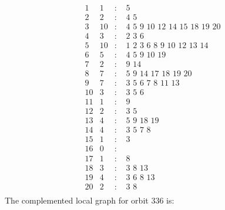 \documentclass[12pt]{article}
\begin{document}
\begin{equation*}
\begin{array}{rrcl}
1&1&:&\,\,5\\
2&2&:&\,\,4\,\,5\\
3&10&:&\,\,4\,\,5\,\,9\,\,10\,\,12\,\,14\,\,15\,\,18\,\,19\,\,20\\
4&3&:&\,\,2\,\,3\,\,6\\
5&10&:&\,\,1\,\,2\,\,3\,\,6\,\,8\,\,9\,\,10\,\,12\,\,13\,\,14\\
6&5&:&\,\,4\,\,5\,\,9\,\,10\,\,19\\
7&2&:&\,\,9\,\,14\\
8&7&:&\,\,5\,\,9\,\,14\,\,17\,\,18\,\,19\,\,20\\
9&7&:&\,\,3\,\,5\,\,6\,\,7\,\,8\,\,11\,\,13\\
10&3&:&\,\,3\,\,5\,\,6\\
11&1&:&\,\,9\\
12&2&:&\,\,3\,\,5\\
13&4&:&\,\,5\,\,9\,\,18\,\,19\\
14&4&:&\,\,3\,\,5\,\,7\,\,8\\
15&1&:&\,\,3\\
16&0&:&\\
17&1&:&\,\,8\\
18&3&:&\,\,3\,\,8\,\,13\\
19&4&:&\,\,3\,\,6\,\,8\,\,13\\
20&2&:&\,\,3\,\,8\\
\end{array}
\end{equation*}
The complemented local graph for orbit $336$ is:
\end{document}
